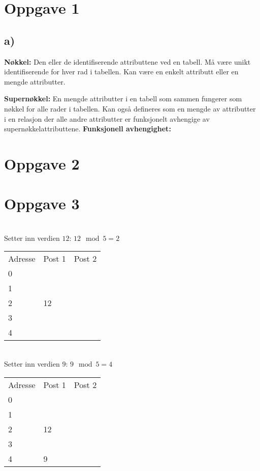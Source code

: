 \documentclass[a4paper, 12pt] {article}
\begin{document}

\newpage

\tableofcontents
\newpage


\section{Oppgave 1}

\subsection{a)}

\textbf{Nøkkel:} Den eller de identifiserende attributtene ved en tabell. Må være unikt identifiserende for hver rad i tabellen. Kan være en enkelt attributt eller en mengde attributter.


\textbf{Supernøkkel:} En mengde attributter i en tabell som sammen fungerer som nøkkel for alle rader i tabellen. Kan også defineres som en mengde av attributter i en relasjon der alle andre attributter er funksjonelt avhengige av supernøkkelattributtene.
\textbf{Funksjonell avhengighet:} 

\section{Oppgave 2}

\newpage
\section{Oppgave 3}
~\\
Setter inn verdien $12$: $12 \mod 5 = 2$\\
\begin{tabular}{|l|l|l|}
    \hline
    Adresse & Post 1 & Post 2 \\
    0       & ~      & ~      \\
    1       & ~      & ~      \\
    2       & 12     & ~      \\
    3       & ~      & ~      \\
    4       & ~      & ~      \\ \hline
\end{tabular}

~\\
Setter inn verdien $9$: $9 \mod 5 = 4$\\
\begin{tabular}{|l|l|l|}
    \hline
    Adresse & Post 1 & Post 2 \\
    0       & ~      & ~      \\
    1       & ~      & ~      \\
    2       & 12     & ~      \\
    3       & ~      & ~      \\
    4       & 9      & ~      \\ \hline
\end{tabular}
\end{document}
